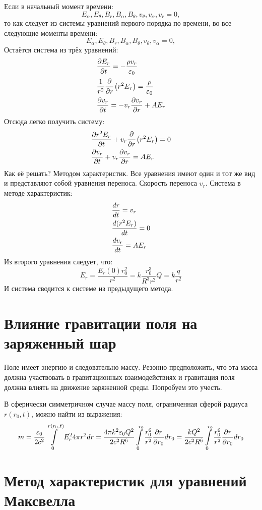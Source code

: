 Если в начальный момент времени:
\[
	E_\alpha, E_\theta, B_r, B_\alpha, B_\theta, v_\theta, v_\alpha, v_r = 0,
\]
то как следует из системы уравнений первого порядка по времени, во все следующие моменты времени:
\[
	E_\alpha, E_\theta, B_r, B_\alpha, B_\theta, v_\theta, v_\alpha = 0,
\]
Остаётся система из трёх уравнений:
\[
	\begin{aligned}
	& \frac{\partial E_r}{\partial t} = - \frac{\rho v_r}{\varepsilon_0} \\
	& \frac{1}{r^2} \cfrac{\partial}{\partial r} \left( r^2 E_r\right) = \frac{\rho}{\varepsilon_0} \\
	& \frac{\partial v_r}{\partial t} = - v_r\frac{\partial v_r}{\partial r} + A E_r
	\end{aligned}
\]
Отсюда легко получить систему:
\[
	\begin{aligned}
	& \frac{\partial r^2 E_r}{\partial t} + v_r \cfrac{\partial}{\partial r} \left( r^2 E_r\right) = 0 \\
	& \frac{\partial v_r}{\partial t} + v_r\frac{\partial v_r}{\partial r} = A E_r
	\end{aligned}
\]
Как её решать? Методом характеристик. Все уравнения имеют один и тот же вид и представляют собой уравнения переноса. Скорость переноса $v_r$. Система в методе характеристик:
\[
	\begin{aligned}
	& \frac{d r}{d t} = v_r \\
	& \frac{d (r^2 E_r)}{d t} = 0 \\
	& \frac{d v_r}{d t} = A E_r
	\end{aligned}
\]
Из второго уравнения следует, что:
\[
	E_r = \frac{E_r(0) r_0^2}{r^2} = k\frac{r_0^3}{R^3 r^2} Q = k \frac{q}{r^2}
\]
И система сводится к системе из предыдущего метода.

\section{Влияние гравитации поля на заряженный шар}

Поле имеет энергию и следовательно массу. Резонно предположить, что эта масса должна участвовать в гравитационных взаимодействиях и гравитация поля должна влиять на движение заряженной среды. Попробуем это учесть.

В сферически симметричном случае массу поля, ограниченная сферой радиуса $r(r_0, t)$, можно найти из выражения:
\[
	m = \frac{\varepsilon_0}{2c^2} \int\limits_0^{r(r_0, t)} E_r^2 4 \pi r^2 dr = 
	\frac{4\pi k^2 \varepsilon_0 Q^2}{2c^2 R^6} \int\limits_0^{r_0} \frac{r_0^6}{r^2} \frac{\partial r}{\partial r_0} dr_0 =
	\frac{k Q^2}{2c^2 R^6} \int\limits_0^{r_0} \frac{r_0^6}{r^2} \frac{\partial r}{\partial r_0} dr_0
\]


\section{Метод характеристик для уравнений Максвелла}

